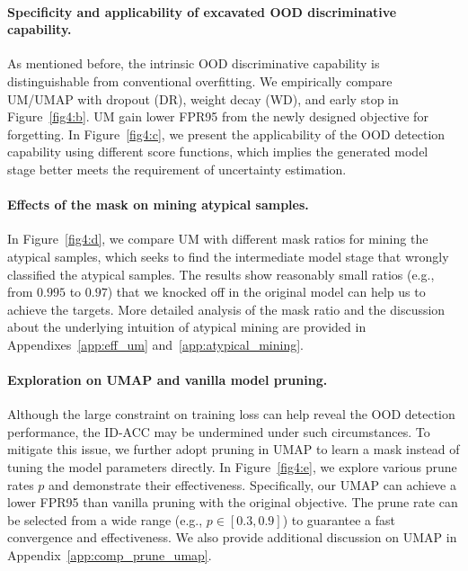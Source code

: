 \documentclass{article}
\theoremstyle{plain}
\theoremstyle{definition}
\theoremstyle{remark}
\begin{document}
\paragraph{Specificity and applicability of excavated OOD discriminative capability.} As mentioned before, the intrinsic OOD discriminative capability is distinguishable from conventional overfitting. We empirically compare UM/UMAP with dropout (DR), weight decay (WD), and early stop in Figure~\ref{fig4:b}. UM gain lower FPR95 from the newly designed objective for forgetting. In Figure~\ref{fig4:c}, we present the applicability of the OOD detection capability using different score functions, which implies the generated model stage better meets the requirement of uncertainty estimation.





\paragraph{Effects of the mask on mining atypical samples.} In Figure~\ref{fig4:d}, we compare UM with different mask ratios for mining the atypical samples, which seeks to find the intermediate model stage that wrongly classified the atypical samples. The results show reasonably small ratios (e.g., from $0.995$ to $0.97$) that we knocked off in the original model can help us to achieve the targets. More detailed analysis of the mask ratio and the discussion about the underlying intuition of atypical mining are provided in Appendixes~\ref{app:eff_um} and~\ref{app:atypical_mining}.







\paragraph{Exploration on UMAP and vanilla model pruning.} Although the large constraint on training loss can help reveal the OOD detection performance, the ID-ACC may be undermined under such circumstances. To mitigate this issue, we further adopt pruning in UMAP to learn a mask instead of tuning the model parameters directly. In Figure~\ref{fig4:e}, we explore various prune rates $p$ and demonstrate their effectiveness. Specifically, our UMAP can achieve a lower FPR95 than vanilla pruning with the original objective.
The prune rate can be selected from a wide range (e.g., $p \in [0.3, 0.9]$) to guarantee a fast convergence and effectiveness. We also provide additional discussion on UMAP in Appendix~\ref{app:comp_prune_umap}.
\end{document}

